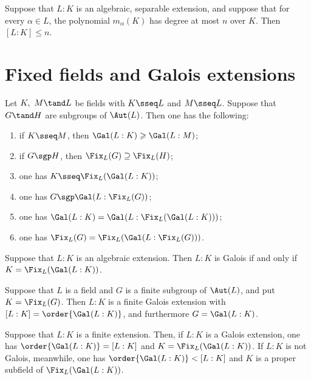 \documentclass{article}
\begin{document}
  \begin{corollary}
    Suppose that $L:K$ is an algebraic, separable extension, and suppose that for every $\alpha\in L$, the polynomial $m_\alpha(K)$ has degree at most $n$ over $K$. Then $[L:K]\leq n$.
  \end{corollary}

\section{Fixed fields and Galois extensions}
  \begin{proposition}
    Let $K,\ M \tand L$ be fields with $K\sseq L$ and $M\sseq L$. Suppose that $G\tand H$ are subgroups of $\Aut(L)$. Then one has the following:
    \begin{enumerate}[label=(\alph*)]
      \item if $K\sseq M$, then $\Gal(L:K) \geqslant \Gal(L:M)$;
      \item if $G\sgp H$, then $\Fix_L(G)\supseteq \Fix_L(H)$;
      \item one has $K\sseq \Fix_L(\Gal(L:K))$;
      \item one has $G\sgp\Gal(L:\Fix_L(G))$;
      \item one has $\Gal(L:K) = \Gal(L:\Fix_L(\Gal(L:K)))$;
      \item one has $\Fix_L(G) = \Fix_L(\Gal(L:\Fix_L(G)))$.
    \end{enumerate}
  \end{proposition}

  \begin{theorem}
    Suppose that $L:K$ is an algebraic extension. Then $L:K$ is Galois if and only if $K=\Fix_L(\Gal(L:K))$.
  \end{theorem}

  \begin{theorem}
    Suppose that $L$ is a field and $G$ is a finite subgroup of $\Aut(L)$, and put $K=\Fix_L(G)$. Then $L:K$ is a finite Galois extension with $[L:K]=\order{\Gal(L:K)}$, and furthermore $G=\Gal(L:K)$.
  \end{theorem}

  \begin{theorem}
    Suppose that $L:K$ is a finite extension. Then, if $L:K$ is a Galois extension, one has $\order{\Gal(L:K)}=[L:K]$ and $K=\Fix_L(\Gal(L:K))$. If $L:K$ is not Galois, meanwhile, one has $\order{\Gal(L:K)}<[L:K]$ and $K$ is a proper subfield of $\Fix_L(\Gal(L:K))$.
  \end{theorem}
\end{document}
